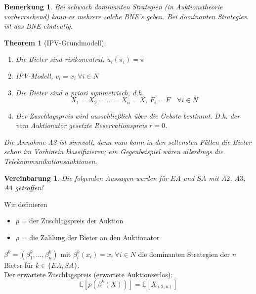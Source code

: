\documentclass[12pt]{extreport} %
\theoremstyle{named}
\newtheorem{unnamedtheorem}{Theorem} \counterwithin{unnamedtheorem}{chapter}
\theoremstyle{itshape}
\theoremstyle{normal}
\newtheorem*{bemerkung}{Bemerkung}
\newtheorem*{vereinbarung}{Vereinbarung}
\begin{document}
\begin{bemerkung}
	Bei schwach dominanten Strategien (in Auktionstheorie vorherrschend) kann er mehrere solche BNE's geben. Bei dominanten Strategien ist das BNE eindeutig.	
\end{bemerkung}

  
\begin{unnamedtheorem}[IPV-Grundmodell] ~\
	\begin{enumerate}
		\item[\hspace{0.5cm}A1:] Die Bieter sind risikoneutral, $u_{i}(\pi_{i}) = \pi$
		\item[\hspace{0.5cm}A2:] IPV-Modell, $v_{i} = x_{i} ~\forall i \in N$
		\item[\hspace{0.5cm}A3:] Die Bieter sind a priori symmetrisch, d.h.
			$$ X_{1} = X_{2} = \dotsc = X_{n} = X, ~F_{i} = F \quad \forall i \in N $$
		\item[\hspace{0.25cm}A4:] Der Zuschlagspreis wird ausschließlich über die Gebote bestimmt. D.h. der vom Auktionator gesetzte Reservationspreis $r = 0$.
	\end{enumerate}
	Die Annahme A3 ist sinnvoll, denn man kann in den seltensten Fällen die Bieter schon im Vorhinein klassifizieren; ein Gegenbeispiel wären allerdings die Telekommunikationsauktionen.
\end{unnamedtheorem}

\begin{vereinbarung}
	Die folgenden Aussagen werden für $EA$ und $SA$ mit $A2$, $A3$, $A4$ getroffen!
\end{vereinbarung}

Wir definieren
\begin{itemize}
	\item $p$ = der Zuschlagspreis der Auktion
	\item $\rho$ = die Zahlung der Bieter an den Auktionator
\end{itemize}

$\beta^{k} = \left(\beta_{1}^{k}, \dotsc, \beta_{n}^{k} \right)$ mit $\beta_{i}^{k}(x_{i}) = x_{i} ~\forall i \in N$ die dominanten Strategien der $n$ Bieter für $k \in \{ EA, SA \}$. \\

Der erwartete Zuschlagspreis (erwartete Auktionserlös):
	$$ \mathbb{E}\left[ p\left(\beta^{k}(X) \right) \right] = \mathbb{E}[X_{(2,n)}] $$
	
\end{document}
